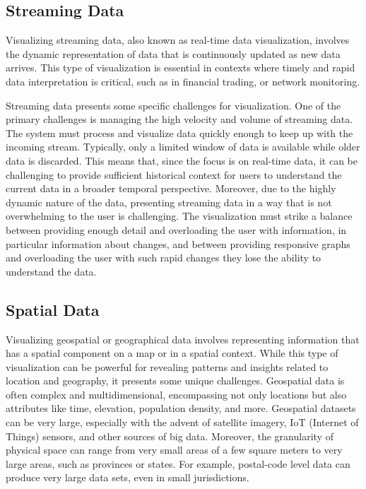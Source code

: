 \subsection*{Streaming Data}

Visualizing streaming data, also known as real-time data visualization, involves the dynamic representation of data that is continuously updated as new data arrives. This type of visualization is essential in contexts where timely and rapid data interpretation is critical, such as in financial trading, or network monitoring. 

Streaming data presents some specific challenges for visualization. One of the primary challenges is managing the high velocity and volume of streaming data. The system must process and visualize data quickly enough to keep up with the incoming stream. Typically, only a limited window of data is available while older data is discarded. This means that, since the focus is on real-time data, it can be challenging to provide sufficient historical context for users to understand the current data in a broader temporal perspective. Moreover, due to the highly dynamic nature of the data, presenting streaming data in a way that is not overwhelming to the user is challenging. The visualization must strike a balance between providing enough detail and overloading the user with information, in particular information about changes, and between providing responsive graphs and overloading the user with such rapid changes they lose the ability to understand the data.

\subsection*{Spatial Data}

Visualizing geospatial or geographical data involves representing information that has a spatial component on a map or in a spatial context. While this type of visualization can be powerful for revealing patterns and insights related to location and geography, it presents some unique challenges. Geospatial data is often complex and multidimensional, encompassing not only locations but also attributes like time, elevation, population density, and more. Geospatial datasets can be very large, especially with the advent of satellite imagery, IoT (Internet of Things) sensors, and other sources of big data. Moreover, the granularity of physical space can range from very small areas of a few square meters to very large areas, such as provinces or states. For example, postal-code level data can produce very large data sets, even in small jurisdictions. 

